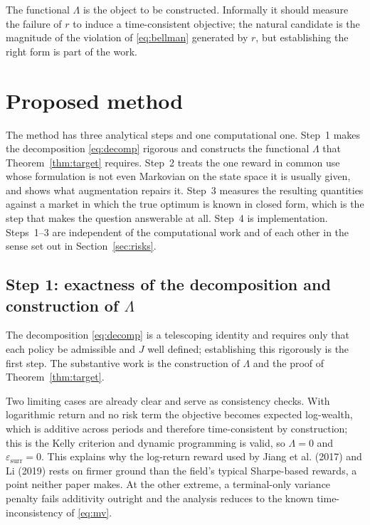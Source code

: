 \documentclass[11pt,a4paper]{article}
\theoremstyle{plain}
\theoremstyle{definition}
\newcommand{\epssurr}{\varepsilon_{\mathrm{surr}}}
\begin{document}
The functional $\Lambda$ is the object to be constructed. Informally it should measure
the failure of $r$ to induce a time-consistent objective; the natural candidate is the
magnitude of the violation of \eqref{eq:bellman} generated by $r$, but establishing the
right form is part of the work.

\section{Proposed method}

The method has three analytical steps and one computational one. Step~1 makes the
decomposition \eqref{eq:decomp} rigorous and constructs the functional $\Lambda$ that
Theorem~\ref{thm:target} requires. Step~2 treats the one reward in common use whose
formulation is not even Markovian on the state space it is usually given, and shows what
augmentation repairs it. Step~3 measures the resulting quantities against a market in
which the true optimum is known in closed form, which is the step that makes the
question answerable at all. Step~4 is implementation. Steps~1--3 are independent of the
computational work and of each other in the sense set out in Section~\ref{sec:risks}.

\subsection{Step 1: exactness of the decomposition and construction of $\Lambda$}

The decomposition \eqref{eq:decomp} is a telescoping identity and requires only that
each policy be admissible and $J$ well defined; establishing this rigorously is the
first step. The substantive work is the construction of $\Lambda$ and the proof of
Theorem~\ref{thm:target}.

Two limiting cases are already clear and serve as consistency checks. With logarithmic
return and no risk term the objective becomes expected log-wealth, which is additive
across periods and therefore time-consistent by construction; this is the Kelly
criterion and dynamic programming is valid, so $\Lambda=0$ and $\epssurr=0$. This
explains why the log-return reward used by Jiang et al. (2017) and
Li (2019) rests on firmer ground than the field's typical Sharpe-based
rewards, a point neither paper makes. At the other extreme, a terminal-only variance
penalty fails additivity outright and the analysis reduces to the known
time-inconsistency of \eqref{eq:mv}.
\end{document}
